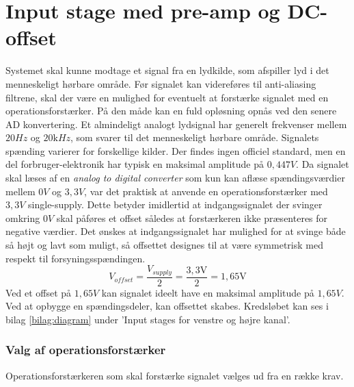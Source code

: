 \section{Input stage med pre-amp og DC-offset}
\label{sec:inputstage}
Systemet skal kunne modtage et signal fra en lydkilde, som afspiller lyd i det menneskeligt hørbare område. 
Før signalet kan videreføres til anti-aliasing filtrene, skal der være en mulighed for eventuelt at forstærke signalet med en operationsforstærker. 
På den måde kan en fuld opløsning opnås ved den senere AD konvertering. 
\newline
Et almindeligt analogt lydsignal har generelt frekvenser mellem $20\si{Hz}$ og $20\si{\kilo Hz}$, som svarer til det menneskeligt hørbare område. 
Signalets spænding varierer for forskellige kilder. 
Der findes ingen officiel standard, men en del forbruger-elektronik har typisk en maksimal amplitude på $0,447\si{V}$.\cite{wikiLine} 
\newline
Da signalet skal læses af en \textit{analog to digital converter} som kun kan aflæse spændingsværdier mellem $0\si{V}$ og $3,3\si{V}$, var det praktisk at anvende en operationsforstærker med $3,3\si{V}$ single-supply.
Dette betyder imidlertid at indgangssignalet der svinger omkring $0\si{V}$ skal påføres et offset således at forstærkeren ikke præsenteres for negative værdier.  
Det ønskes at indgangssignalet har mulighed for at svinge både så højt og lavt som muligt, så offsettet designes til at være symmetrisk med respekt til  forsyningsspændingen. 
\begin{equation}
	{V_{offset}} = \frac{V_{supply}}{2} = \frac{3,3\text{V}}{2} = 1,65\text{V}
\end{equation}
Ved et offset på $1,65\si{V}$ kan signalet ideelt have en maksimal amplitude på $1,65\si{V}$. 
Ved at opbygge en spændingsdeler, kan offsettet skabes. 
Kredsløbet kan ses i bilag \ref{bilag:diagram} under 'Input stages for venstre og højre kanal'.

\subsubsection{Valg af operationsforstærker}
Operationsforstærkeren som skal forstærke signalet vælges ud fra en række krav. 

